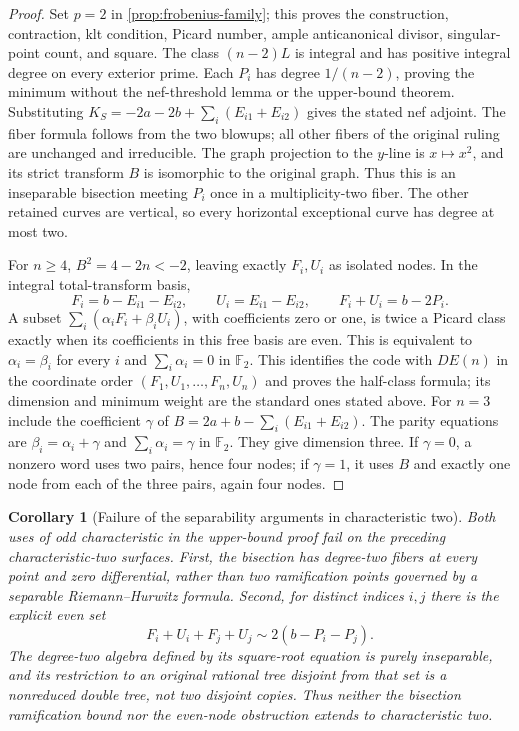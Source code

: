 \documentclass[11pt,reqno]{amsart}
\newtheorem{corollary}[corollary]{Corollary}
\theoremstyle{definition}
\theoremstyle{remark}
\newcommand{\FF}{\mathbb F}
\numberwithin{equation}{section}
\begin{document}
\begin{proof}
Set $p=2$ in \cref{prop:frobenius-family}; this proves the
construction, contraction, klt condition, Picard number, ample
anticanonical divisor, singular-point count, and square.
The class $(n-2)L$ is integral and has positive integral degree on every
exterior prime. Each $P_i$ has degree $1/(n-2)$, proving the
minimum without the nef-threshold lemma or the upper-bound theorem.
Substituting $K_S=-2a-2b+\sum_i(E_{i1}+E_{i2})$ gives the stated
nef adjoint. The fiber formula follows from the two blowups; all other
fibers of the original ruling are unchanged and irreducible.
The graph projection to the $y$-line is $x\mapsto x^2$, and its strict
transform $B$ is isomorphic to the original graph. Thus this is an
inseparable bisection meeting $P_i$ once in a multiplicity-two
fiber. The other retained curves are vertical, so every horizontal exceptional curve has degree at most two.

For $n\ge4$, $B^2=4-2n<-2$, leaving exactly $F_i,U_i$ as isolated nodes.
In the integral total-transform basis,
\[
 F_i=b-E_{i1}-E_{i2},\qquad U_i=E_{i1}-E_{i2},\qquad
 F_i+U_i=b-2P_i.
\]
A subset $\sum_i(\alpha_iF_i+\beta_iU_i)$, with coefficients zero or one,
is twice a Picard class exactly when its coefficients in this free basis
are even. This is equivalent to
$\alpha_i=\beta_i$ for every $i$ and $\sum_i\alpha_i=0$ in $\FF_2$.
This identifies the code with $DE(n)$ in the coordinate order
$(F_1,U_1,\ldots,F_n,U_n)$ and proves the half-class formula; its
dimension and minimum weight are the standard ones stated above.
For $n=3$ include the coefficient $\gamma$ of
$B=2a+b-\sum_i(E_{i1}+E_{i2})$.
The parity equations are
$\beta_i=\alpha_i+\gamma$ and $\sum_i\alpha_i=\gamma$ in $\FF_2$.
They give dimension three. If $\gamma=0$, a nonzero word uses two pairs,
hence four nodes; if $\gamma=1$, it uses $B$ and exactly one node from
each of the three pairs, again four nodes.


\end{proof}

\begin{corollary}[Failure of the separability arguments in characteristic two]
\label{cor:inseparable-covers}
Both uses of odd characteristic in the upper-bound proof fail on the
preceding characteristic-two surfaces.
First, the bisection has degree-two fibers at every point and zero
differential, rather than two ramification points governed by a
separable Riemann--Hurwitz formula.
Second, for distinct indices $i,j$ there is the explicit even set
\[
 F_i+U_i+F_j+U_j\sim2(b-P_i-P_j).
\]
The degree-two algebra defined by its square-root equation is purely
inseparable, and its restriction to an original rational tree disjoint from
that set is a nonreduced double tree, not two disjoint copies.
Thus neither the bisection ramification bound nor the even-node
obstruction extends to characteristic two.
\end{corollary}
\end{document}
